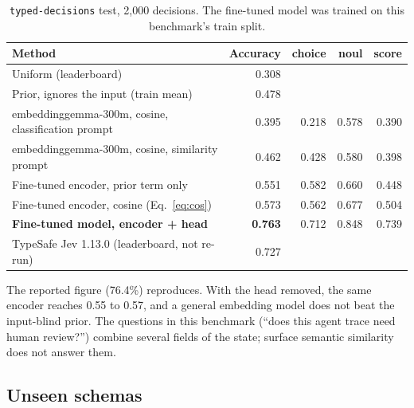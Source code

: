 \documentclass[11pt]{article}
\begin{document}
\begin{table}[h]\centering
\begin{tabular}{lrrrr}
\toprule
Method & Accuracy & choice & noul & score \\
\midrule
Uniform (leaderboard) & 0.308 \\
Prior, ignores the input (train mean) & 0.478 \\
\midrule
embeddinggemma-300m, cosine, classification prompt & 0.395 & 0.218 & 0.578 & 0.390 \\
embeddinggemma-300m, cosine, similarity prompt & 0.462 & 0.428 & 0.580 & 0.398 \\
Fine-tuned encoder, prior term only & 0.551 & 0.582 & 0.660 & 0.448 \\
Fine-tuned encoder, cosine (Eq.~\ref{eq:cos}) & 0.573 & 0.562 & 0.677 & 0.504 \\
\textbf{Fine-tuned model, encoder + head} & \textbf{0.763} & 0.712 & 0.848 & 0.739 \\
\midrule
TypeSafe Jev 1.13.0 (leaderboard, not re-run) & 0.727 \\
\bottomrule
\end{tabular}
\caption{\texttt{typed-decisions} test, 2{,}000 decisions. The fine-tuned
model was trained on this benchmark's train split.}
\label{tab:td}
\end{table}

The reported figure (76.4\%) reproduces. With the head removed, the same
encoder reaches 0.55 to 0.57, and a general embedding model does not beat the
input-blind prior. The questions in this benchmark (``does this agent trace
need human review?'') combine several fields of the state; surface semantic
similarity does not answer them.

\subsection{Unseen schemas}
\end{document}
